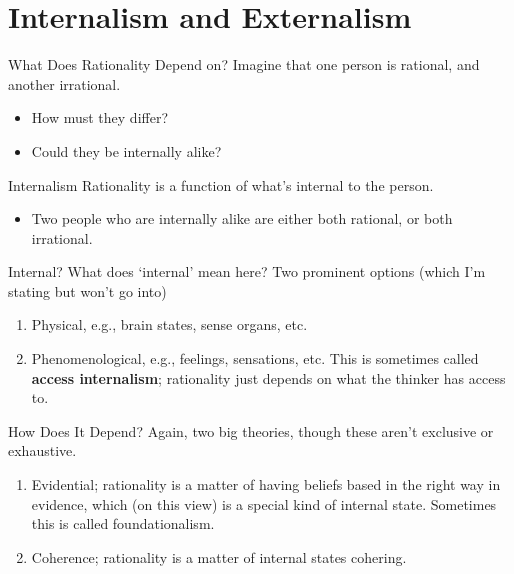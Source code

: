 \documentclass[
  17pt,
  letterpaper,
  ignorenonframetext,
  aspectratio=169,
]{beamer}
\providecommand{\tightlist}{%
  \setlength{\itemsep}{0pt}\setlength{\parskip}{0pt}}\usepackage{longtable,booktabs,array}
\begin{document}
\hypertarget{internalism-and-externalism}{%
\section{Internalism and
Externalism}\label{internalism-and-externalism}}

\begin{frame}{What Does Rationality Depend on?}
\protect\hypertarget{what-does-rationality-depend-on}{}
Imagine that one person is rational, and another irrational.

\begin{itemize}[<+->]
\tightlist
\item
  How must they differ?
\item
  Could they be internally alike?
\end{itemize}
\end{frame}

\begin{frame}{Internalism}
\protect\hypertarget{internalism}{}
Rationality is a function of what's internal to the person.

\begin{itemize}[<+->]
\tightlist
\item
  Two people who are internally alike are either both rational, or both
  irrational.
\end{itemize}
\end{frame}

\begin{frame}{Internal?}
\protect\hypertarget{internal}{}
What does `internal' mean here? Two prominent options (which I'm stating
but won't go into)

\begin{enumerate}[<+->]
\tightlist
\item
  Physical, e.g., brain states, sense organs, etc.
\item
  Phenomenological, e.g., feelings, sensations, etc. This is sometimes
  called \textbf{access internalism}; rationality just depends on what
  the thinker has access to.
\end{enumerate}
\end{frame}

\begin{frame}{How Does It Depend?}
\protect\hypertarget{how-does-it-depend}{}
Again, two big theories, though these aren't exclusive or exhaustive.

\begin{enumerate}[<+->]
\tightlist
\item
  Evidential; rationality is a matter of having beliefs based in the
  right way in evidence, which (on this view) is a special kind of
  internal state. Sometimes this is called foundationalism.
\item
  Coherence; rationality is a matter of internal states cohering.
\end{enumerate}
\end{frame}
\end{document}
